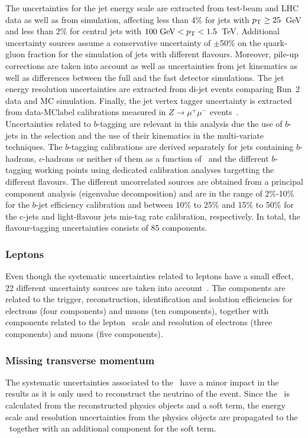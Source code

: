 The uncertainties for the jet energy scale are extracted from test-beam and LHC data as well as from simulation, affecting less than 4\% for jets with $p_{\text{T}}\geq25$~GeV and less than 2\% for central jets with $100\text{ GeV}<p_{\text{T}}<1.5$~TeV. Additional uncertainty sources assume a conservative uncertainty of $\pm$50\% on the quark-gluon fraction for the simulation of jets with different flavours. Moreover, pile-up corrections are taken into account as well as uncertainties from jet kinematics as well as differences between the full and the fast detector simulations. The jet energy resolution uncertainties are extracted from di-jet events comparing Run~2 data and MC simulation. Finally, the jet vertex tagger uncertainty is extracted from data-\acrshort{MClabel} calibrations measured in $Z\to\mu^+\mu^-$ events~\cite{Bothmann2016}.\\

Uncertainties related to $b$-tagging are relevant in this analysis due the use of $b$-jets in the selection and the use of their kinematics in the multi-variate techniques. The $b$-tagging calibrations are derived separately for jets containing $b$-hadrons, $c$-hadrons or neither of them as a function of \pT\ and the different $b$-tagging working points using dedicated calibration analyses targetting the different flavours. The different uncorrelated sources are obtained from a principal component analysis (eigenvalue decomposition) and are in the range of 2\%-10\% for the $b$-jet efficiency calibration and between 10\% to 25\% and
15\% to 50\% for the c-jets and light-flavour jets mis-tag rate calibration, respectively. In total, the flavour-tagging uncertainties consists of 85 components.\\

\subsubsection{Leptons}
Even though the systematic uncertainties related to leptons have a small effect, 22 different uncertainty sources are taken into account~\cite{Aad_2019,Aad_2016}. The components are related to the trigger, reconstruction, identification and isolation efficiencies for electrons (four components) and muons (ten components), together with components related to the lepton \pT\ scale and resolution of electrons (three components) and muons (five components).

\subsubsection{Missing transverse momentum}
The systematic uncertainties associated to the \MET\ have a minor impact in the results as it is only used to reconstruct the neutrino of the event. Since the \MET\ is calculated from the reconstructed physics objects and a soft term, the energy scale and resolution uncertainties from the physics objects are propagated to the \MET\ together with an additional component for the soft term. 

